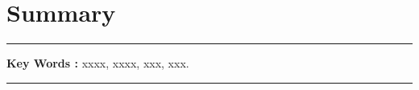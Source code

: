 \chapter*{Summary}


\hspace{16pt}

\noindent\rule[2pt]{\textwidth}{0.5pt}

{\textbf{Key Words :}}
xxxx, xxxx, xxx, xxx.
\\
\noindent\rule[2pt]{\textwidth}{0.5pt}
